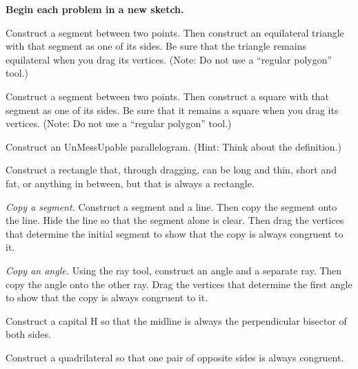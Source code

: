 \documentclass[nooutcomes]{ximera}
\begin{document}
\begin{center}
\textbf{Begin each problem in a new sketch.}
\end{center}

\begin{problem}
Construct a segment between two points.  Then construct an equilateral triangle with that segment as one of its sides.  Be sure that the triangle remains equilateral when you drag its vertices.   (Note:  Do not use a ``regular polygon'' tool.)
\end{problem}

\begin{problem}
Construct a segment between two points.  Then construct a square with that segment as one of its sides.  Be sure that it remains a square when you drag its vertices.  (Note:  Do not use a ``regular polygon'' tool.)
\end{problem}

\begin{problem}
Construct an UnMessUpable parallelogram.  (Hint:  Think about the definition.)  
\end{problem}

\begin{problem}
Construct a rectangle that, through dragging, can be long and thin, short and fat, or anything in between, but that is always a rectangle.
\end{problem}

\begin{problem}
\emph{Copy a segment.}  Construct a segment and a line.  Then copy the segment onto the line.  Hide the line so that the segment alone is clear.  Then drag the vertices that determine the initial segment to show that the copy is always congruent to it.  
\end{problem}

\begin{problem}
\emph{Copy an angle.}  Using the ray tool, construct an angle and a separate ray.  Then copy the angle onto the other ray.  Drag the vertices that determine the first angle to show that the copy is always congruent to it.  
\end{problem}

\begin{problem}
Construct a capital H so that the midline is always the perpendicular bisector of both sides.  
\end{problem}

\begin{problem}
Construct a quadrilateral so that one pair of opposite sides is always congruent.  
\end{problem}
\end{document}
